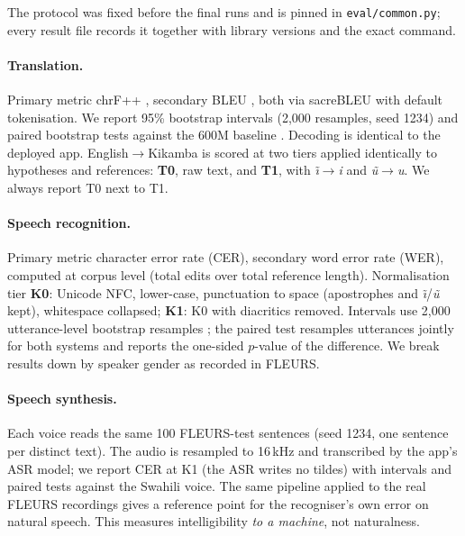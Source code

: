 \documentclass[11pt]{article}
\begin{document}
The protocol was fixed before the final runs and is pinned in \texttt{eval/common.py}; every result file records it together with library versions and the exact command.

\paragraph{Translation.} Primary metric chrF++ \citep{popovic2015chrf,popovic2017chrfpp}, secondary BLEU \citep{papineni2002bleu}, both via sacreBLEU \citep{post2018sacrebleu} with default tokenisation. We report 95\% bootstrap intervals (2,000 resamples, seed 1234) and paired bootstrap tests against the 600M baseline \citep{koehn2004significance}. Decoding is identical to the deployed app. English$\rightarrow$Kikamba is scored at two tiers applied identically to hypotheses and references: \textbf{T0}, raw text, and \textbf{T1}, with \emph{\~{\i}}$\rightarrow$\emph{i} and \emph{\~{u}}$\rightarrow$\emph{u}. We always report T0 next to T1.

\paragraph{Speech recognition.} Primary metric character error rate (CER), secondary word error rate (WER), computed at corpus level (total edits over total reference length). Normalisation tier \textbf{K0}: Unicode NFC, lower-case, punctuation to space (apostrophes and \emph{\~{\i}}/\emph{\~{u}} kept), whitespace collapsed; \textbf{K1}: K0 with diacritics removed. Intervals use 2,000 utterance-level bootstrap resamples \citep{bisani2004bootstrap}; the paired test resamples utterances jointly for both systems and reports the one-sided $p$-value of the difference. We break results down by speaker gender as recorded in FLEURS.

\paragraph{Speech synthesis.} Each voice reads the same 100 FLEURS-test sentences (seed 1234, one sentence per distinct text). The audio is resampled to 16\,kHz and transcribed by the app's ASR model; we report CER at K1 (the ASR writes no tildes) with intervals and paired tests against the Swahili voice. The same pipeline applied to the real FLEURS recordings gives a reference point for the recogniser's own error on natural speech. This measures intelligibility \emph{to a machine}, not naturalness.

\end{document}

